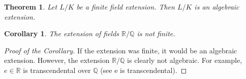\documentclass[12pt]{article}
\newtheorem*{thm}{Theorem}
\newtheorem*{cor}{Corollary}
\newcommand{\Reals}{\mathbb{R}}
\newcommand{\Rats}{\mathbb{Q}}
\begin{document}
\begin{thm}
Let $L/K$ be a finite field extension. Then $L/K$ is an algebraic
extension.
\end{thm}

\begin{cor}
The extension of fields $\Reals/\Rats$ is not finite.
\end{cor}

\begin{proof}[Proof of the Corollary]
If the extension was finite, it would be an algebraic extension. However, the
extension $\Reals/\Rats$ is clearly not algebraic. For example,
$e\in\Reals$ is transcendental over $\Rats$ (see e is transcendental).
\end{proof}
\end{document}

